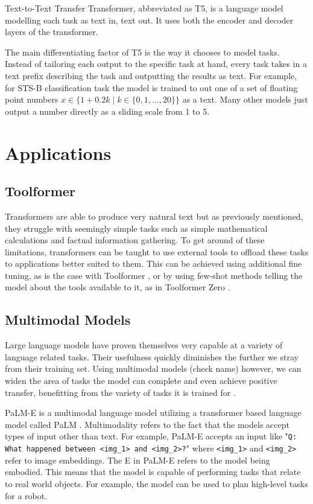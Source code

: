 \documentclass[twoside]{article}
\begin{document}
Text-to-Text Transfer Transformer, abbreviated as T5, is a language model modelling each
task as text in, text out. It uses both the encoder and decoder layers of the transformer.
\cite{raffel_exploring_2020}

The main differentiating factor of T5 is the way it chooses to model tasks. Instead of 
tailoring each output to the specific task at hand, every task takes in a text prefix
describing the task and outputting the results as text. For example, for STS-B classification
task the model is trained to out one of a set of floating point numbers 
$x \in \{ 1+0.2k \mid k \in \{ 0, 1, ..., 20\} \}$ as a text. Many other models just 
output a number directly as a sliding scale from 1 to 5. 

\section{Applications}

\subsection{Toolformer}
Transformers are able to produce very natural text but as previously mentioned, they struggle with seemingly
simple tasks such as simple mathematical calculations and factual information gathering.
To get around of these limitations, transformers can be taught to use external tools
to offload these tasks to applications better suited to them. \cite{schick_toolformer_2023} 
This can be achieved using additional fine tuning, as is the case with Toolformer
\cite{schick_toolformer_2023}, or by using few-shot methods telling the model 
about the tools available to it, as in Toolformer Zero \cite{minosvasilias_markus_toolformer_2023}.

\subsection{Multimodal Models}
Large language models have proven themselves very capable at a variety of language related
tasks. Their usefulness quickly diminishes the further we stray from their training set.
Using multimodal models (check name) however, we can widen the area of tasks the model
can complete and even achieve positive transfer, benefitting from the variety of tasks
it is trained for \cite{driess_palm-e_2023}. 

PaLM-E is a multimodal language model utilizing a transformer based language model called
PaLM \cite{chowdhery_palm_2022,driess_palm-e_2023}. Multimodality refers to the fact that
the models accept types of input other than text. For example, PaLM-E accepts an input like
"\texttt{Q: What happened between <img\_1> and <img\_2>?}" \cite{driess_palm-e_2023} where
\texttt{<img\_1>} and \texttt{<img\_2>} refer to image embeddings. The E in PaLM-E refers to
the model being embodied. This means that the model is capable of performing tasks that
relate to real world objects. For example, the model can be used to plan high-level tasks
for a robot. \cite{driess_palm-e_2023}
\end{document}
